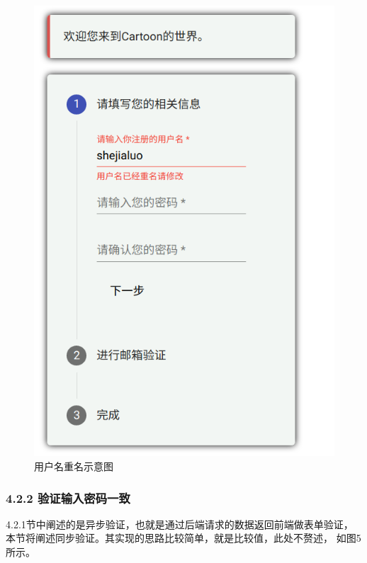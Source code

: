\documentclass[a4paper,12pt, centering]{ctexart}
\begin{document}
  \begin{figure}[h]
    \centering
    \includegraphics{3.png}
    \caption{用户名重名示意图}
  \end{figure}

  \subsubsection*{4.2.2 验证输入密码一致}

  4.2.1节中阐述的是异步验证，也就是通过后端请求的数据返回前端做表单验证，
  本节将阐述同步验证。其实现的思路比较简单，就是比较值，此处不赘述，
  如图5所示。
\end{document}
